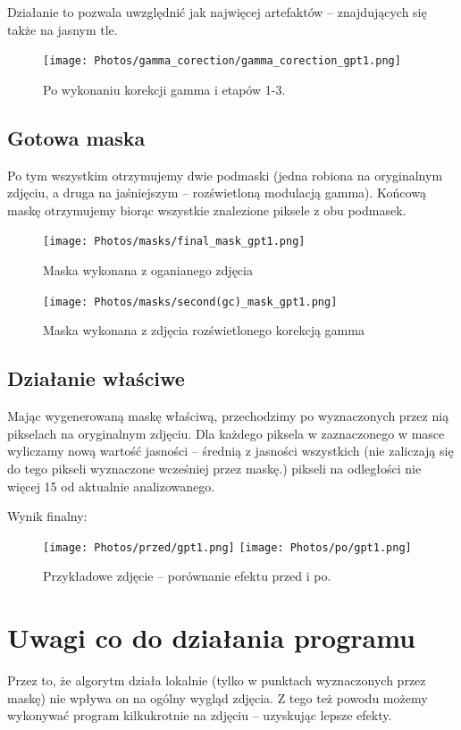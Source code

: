 \documentclass[]{mwart}
\begin{document}
Działanie to pozwala uwzględnić jak najwięcej artefaktów
-- znajdujących się także na jasnym tle.

\begin{figure}[H]
    \centering
    \texttt{[image: Photos/gamma\_corection/gamma\_corection\_gpt1.png]}
    \caption{Po wykonaniu korekcji gamma i etapów 1-3.}
\end{figure}

\newpage
\subsection{Gotowa maska}
Po tym wszystkim otrzymujemy dwie podmaski (jedna robiona na oryginalnym
zdjęciu, a druga na jaśniejszym -- rozświetloną modulacją gamma).
Końcową maskę otrzymujemy biorąc wszystkie znalezione piksele z obu podmasek.

\begin{figure}[H]
    \centering
    \texttt{[image: Photos/masks/final\_mask\_gpt1.png]}
    \caption{Maska wykonana z oganianego zdjęcia}
\end{figure}
\begin{figure}[H]
    \centering
    \texttt{[image: Photos/masks/second(gc)\_mask\_gpt1.png]}
    \caption{Maska wykonana z zdjęcia rozświetlonego korekcją gamma}
\end{figure}


\newpage
\subsection{Działanie właściwe}
Mając wygenerowaną maskę właściwą, przechodzimy po wyznaczonych
przez nią pikselach na oryginalnym zdjęciu. Dla każdego piksela w
zaznaczonego w masce wyliczamy nową wartość jasności -- średnią z
jasności wszystkich (nie zaliczają się do tego pikseli wyznaczone
wcześniej przez maskę.) pikseli na odległości nie więcej 15 od aktualnie analizowanego.

Wynik finalny:
\begin{figure}[H]
    \centering
    \texttt{[image: Photos/przed/gpt1.png]}
    \texttt{[image: Photos/po/gpt1.png]}
    \caption{Przykładowe zdjęcie -- porównanie efektu przed i po.}

\end{figure}

\newpage
\section{Uwagi co do działania programu}
Przez to, że algorytm działa lokalnie (tylko w punktach wyznaczonych
przez maskę) nie wpływa on na ogólny wygląd zdjęcia.
Z tego też powodu możemy wykonywać program kilkukrotnie na zdjęciu
-- uzyskując lepsze efekty.
\end{document}
